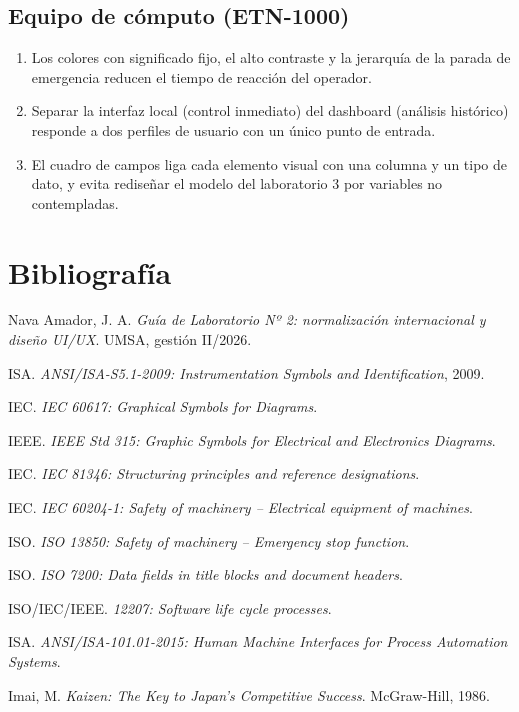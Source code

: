 \documentclass[a4paper,11pt]{article}
\begin{document}
\subsection{Equipo de cómputo (ETN-1000)}
\begin{enumerate}
\item Los colores con significado fijo, el alto contraste y la jerarquía de la parada de emergencia reducen el tiempo de reacción del operador.
\item Separar la interfaz local (control inmediato) del dashboard (análisis histórico) responde a dos perfiles de usuario con un único punto de entrada.
\item El cuadro de campos liga cada elemento visual con una columna y un tipo de dato, y evita rediseñar el modelo del laboratorio 3 por variables no contempladas.
\end{enumerate}

\section*{Bibliografía}
\begin{enumerate}[label={[\arabic*]}, leftmargin=*]
\item Nava Amador, J. A. \emph{Guía de Laboratorio Nº 2: normalización internacional y diseño UI/UX}. UMSA, gestión II/2026.
\item ISA. \emph{ANSI/ISA-S5.1-2009: Instrumentation Symbols and Identification}, 2009.
\item IEC. \emph{IEC 60617: Graphical Symbols for Diagrams}.
\item IEEE. \emph{IEEE Std 315: Graphic Symbols for Electrical and Electronics Diagrams}.
\item IEC. \emph{IEC 81346: Structuring principles and reference designations}.
\item IEC. \emph{IEC 60204-1: Safety of machinery -- Electrical equipment of machines}.
\item ISO. \emph{ISO 13850: Safety of machinery -- Emergency stop function}.
\item ISO. \emph{ISO 7200: Data fields in title blocks and document headers}.
\item ISO/IEC/IEEE. \emph{12207: Software life cycle processes}.
\item ISA. \emph{ANSI/ISA-101.01-2015: Human Machine Interfaces for Process Automation Systems}.
\item Imai, M. \emph{Kaizen: The Key to Japan's Competitive Success}. McGraw-Hill, 1986.
\end{enumerate}
\end{document}
